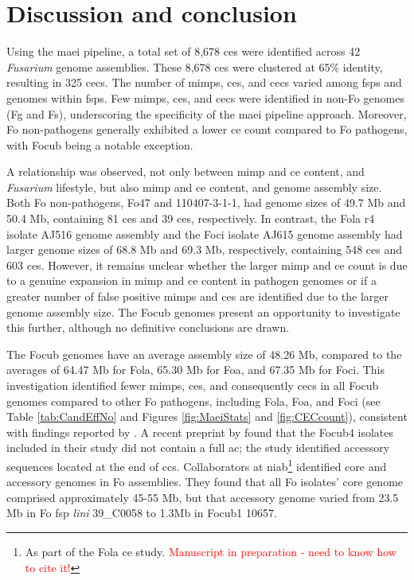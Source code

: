 \newpage
\section{Discussion and conclusion}

Using the \ac{maei} pipeline, a total set of 8,678 \acp{ce} were identified across 42 \textit{Fusarium} genome assemblies. These 8,678 \acp{ce} were clustered at 65\% identity, resulting in 325 \acfp{cec}. The number of \acp{mimp}, \acp{ce}, and \acp{cec} varied among \acp{fsp} and genomes within \acp{fsp}. Few \acp{mimp}, \acp{ce}, and \acp{cec} were identified in non-\ac{Fo} genomes (\acl{Fg} and \acl{Fs}), underscoring the specificity of the \ac{maei} pipeline approach. Moreover, \ac{Fo} non-pathogens generally exhibited a lower \ac{ce} count compared to \ac{Fo} pathogens, with \ac{Focub} being a notable exception.

A relationship was observed, not only between \ac{mimp} and \ac{ce} content, and \textit{Fusarium} lifestyle,  but also \ac{mimp} and \ac{ce} content, and genome assembly size. Both \ac{Fo} non-pathogens, Fo47 and 110407-3-1-1, had genome sizes of 49.7 Mb and 50.4 Mb, containing 81 \acp{ce} and 39 \acp{ce}, respectively. In contrast, the \ac{Fola} \ac{r4} isolate AJ516 genome assembly and the \ac{Foci} isolate AJ615 genome assembly had larger genome sizes of 68.8 Mb and 69.3 Mb, respectively, containing 548 \acp{ce} and 603 \acp{ce}. However, it remains unclear whether the larger \ac{mimp} and \ac{ce} count is due to a genuine expansion in \ac{mimp} and \ac{ce} content in pathogen genomes or if a greater number of false positive \acp{mimp} and \acp{ce} are identified due to the larger genome assembly size. The \ac{Focub} genomes present an opportunity to investigate this further, although no definitive conclusions are drawn.

The \ac{Focub} genomes have an average assembly size of 48.26 Mb, compared to the averages of 64.47 Mb for \ac{Fola}, 65.30 Mb for \ac{Foa}, and 67.35 Mb for \ac{Foci}. This investigation identified fewer \acp{mimp}, \acp{ce}, and consequently \acp{cec} in all \ac{Focub} genomes compared to other \ac{Fo} pathogens, including \ac{Fola}, \ac{Foa}, and \ac{Foci} (see Table \ref{tab:CandEffNo} and Figures \ref{fig:MaeiStats} and \ref{fig:CECcount}), consistent with findings reported by \textcite{Dam2016, FoEC2}. A recent preprint by \textcite{Ma2023} found that the \ac{Focub4} isolates included in their study did not contain a full \acf{ac}; the study identified accessory sequences located at the end of \acfp{cc}. Collaborators at \ac{niab}\footnote{As part of the \acf{Fola} \ac{ce} study. \textcolor{red}{Manuscript in preparation - need to know how to cite it!}} identified core and accessory genomes in \ac{Fo} assemblies. They found that all \ac{Fo} isolates' core genome comprised approximately 45-55 Mb, but that accessory genome varied from 23.5 Mb in \ac{Fo} \ac{fsp} \textit{lini} 39\_C0058 to 1.3Mb in \ac{Focub1} 10657. 


